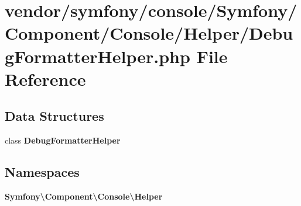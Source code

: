 \section{vendor/symfony/console/\+Symfony/\+Component/\+Console/\+Helper/\+Debug\+Formatter\+Helper.php File Reference}
\label{_debug_formatter_helper_8php}
\subsection*{Data Structures}
\begin{DoxyCompactItemize}
\item 
class {\bf Debug\+Formatter\+Helper}
\end{DoxyCompactItemize}
\subsection*{Namespaces}
\begin{DoxyCompactItemize}
\item 
 {\bf Symfony\textbackslash{}\+Component\textbackslash{}\+Console\textbackslash{}\+Helper}
\end{DoxyCompactItemize}
